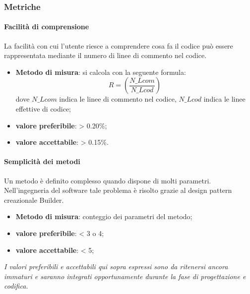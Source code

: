 \subsubsection{Metriche}

\paragraph{Facilità di comprensione}
La facilità con cui l’utente riesce a comprendere cosa fa il codice può essere rappresentata mediante il numero di linee di commento nel codice.
\begin{itemize}
\item \textbf{Metodo di misura}: si calcola con la seguente formula:
\[R = (\frac{N\_Lcom}{N\_Lcod})\]
dove $N\_Lcom$ indica le linee di commento nel codice, $N\_Lcod$ indica le linee effettive di codice;
\item \textbf{valore preferibile}: > 0.20\%;
\item \textbf{valore accettabile}: > 0.15\%.
\end{itemize}

\paragraph{Semplicità dei metodi}
Un metodo è definito complesso quando dispone di molti parametri. Nell'ingegneria del software tale problema è risolto grazie al design pattern creazionale Builder.
\begin{itemize}
\item \textbf{Metodo di misura}: conteggio dei parametri del metodo;
\item \textbf{valore preferibile}: < 3 o 4;
\item \textbf{valore accettabile}: < 5;
\end{itemize}

\textit{I valori preferibili e accettabili qui sopra espressi sono da ritenersi ancora immaturi e saranno integrati opportunamente durante la fase di progettazione e codifica.}

